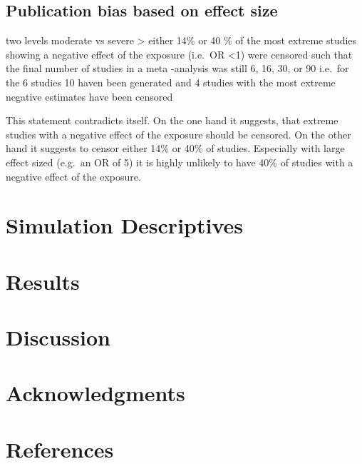 \documentclass[english,doc,floatsintext]{apa6}
\begin{document}
\hypertarget{publication-bias-based-on-effect-size}{%
\subsection{Publication bias based on effect size}\label{publication-bias-based-on-effect-size}}

two levels
moderate vs severe
\textgreater{} either 14\% or 40 \% of the most extreme studies showing a negative effect of the exposure (i.e.~OR \textless{}1)
were censored such that the final number of studies in a meta -analysis was still 6, 16, 30, or 90
i.e.~for the 6 studies 10 haven been generated and 4 studies with the most extreme negative estimates have been censored

This statement contradicts itself. On the one hand it suggests, that extreme studies with a negative effect of the exposure should be censored.
On the other hand it suggests to censor either 14\% or 40\% of studies. Especially with large effect sized (e.g.~an OR of 5) it is highly unlikely to have 40\% of studies with a negative effect of the exposure.

\hypertarget{simulation-descriptives}{%
\section{Simulation Descriptives}\label{simulation-descriptives}}

\hypertarget{results}{%
\section{Results}\label{results}}

\hypertarget{discussion}{%
\section{Discussion}\label{discussion}}

\hypertarget{acknowledgments}{%
\section{Acknowledgments}\label{acknowledgments}}

\newpage

\newpage

\hypertarget{references}{%
\section{References}\label{references}}
\end{document}
